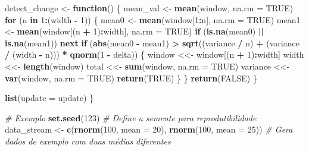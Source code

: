 \documentclass[
]{article}
\newenvironment{Shaded}{\begin{snugshade}}{\end{snugshade}}
\newcommand{\AttributeTok}[1]{\textcolor[rgb]{0.13,0.29,0.53}{#1}}
\newcommand{\CommentTok}[1]{\textcolor[rgb]{0.56,0.35,0.01}{\textit{#1}}}
\newcommand{\ConstantTok}[1]{\textcolor[rgb]{0.56,0.35,0.01}{#1}}
\newcommand{\ControlFlowTok}[1]{\textcolor[rgb]{0.13,0.29,0.53}{\textbf{#1}}}
\newcommand{\DecValTok}[1]{\textcolor[rgb]{0.00,0.00,0.81}{#1}}
\newcommand{\FunctionTok}[1]{\textcolor[rgb]{0.13,0.29,0.53}{\textbf{#1}}}
\newcommand{\NormalTok}[1]{#1}
\newcommand{\OtherTok}[1]{\textcolor[rgb]{0.56,0.35,0.01}{#1}}
\newcommand{\SpecialCharTok}[1]{\textcolor[rgb]{0.81,0.36,0.00}{\textbf{#1}}}
\begin{document}
\begin{Shaded}
\begin{Highlighting}[]
\NormalTok{  detect\_change }\OtherTok{\textless{}{-}} \ControlFlowTok{function}\NormalTok{() \{}
\NormalTok{    mean\_val }\OtherTok{\textless{}{-}} \FunctionTok{mean}\NormalTok{(window, }\AttributeTok{na.rm =} \ConstantTok{TRUE}\NormalTok{)}
    \ControlFlowTok{for}\NormalTok{ (n }\ControlFlowTok{in} \DecValTok{1}\SpecialCharTok{:}\NormalTok{(width }\SpecialCharTok{{-}} \DecValTok{1}\NormalTok{)) \{}
\NormalTok{      mean0 }\OtherTok{\textless{}{-}} \FunctionTok{mean}\NormalTok{(window[}\DecValTok{1}\SpecialCharTok{:}\NormalTok{n], }\AttributeTok{na.rm =} \ConstantTok{TRUE}\NormalTok{)}
\NormalTok{      mean1 }\OtherTok{\textless{}{-}} \FunctionTok{mean}\NormalTok{(window[(n }\SpecialCharTok{+} \DecValTok{1}\NormalTok{)}\SpecialCharTok{:}\NormalTok{width], }\AttributeTok{na.rm =} \ConstantTok{TRUE}\NormalTok{)}
      \ControlFlowTok{if}\NormalTok{ (}\FunctionTok{is.na}\NormalTok{(mean0) }\SpecialCharTok{||} \FunctionTok{is.na}\NormalTok{(mean1)) }\ControlFlowTok{next}
      \ControlFlowTok{if}\NormalTok{ (}\FunctionTok{abs}\NormalTok{(mean0 }\SpecialCharTok{{-}}\NormalTok{ mean1) }\SpecialCharTok{\textgreater{}} \FunctionTok{sqrt}\NormalTok{((variance }\SpecialCharTok{/}\NormalTok{ n) }\SpecialCharTok{+}\NormalTok{ (variance }\SpecialCharTok{/}\NormalTok{ (width }\SpecialCharTok{{-}}\NormalTok{ n))) }\SpecialCharTok{*} \FunctionTok{qnorm}\NormalTok{(}\DecValTok{1} \SpecialCharTok{{-}}\NormalTok{ delta)) \{}
\NormalTok{        window }\OtherTok{\textless{}\textless{}{-}}\NormalTok{ window[(n }\SpecialCharTok{+} \DecValTok{1}\NormalTok{)}\SpecialCharTok{:}\NormalTok{width]}
\NormalTok{        width }\OtherTok{\textless{}\textless{}{-}} \FunctionTok{length}\NormalTok{(window)}
\NormalTok{        total }\OtherTok{\textless{}\textless{}{-}} \FunctionTok{sum}\NormalTok{(window, }\AttributeTok{na.rm =} \ConstantTok{TRUE}\NormalTok{)}
\NormalTok{        variance }\OtherTok{\textless{}\textless{}{-}} \FunctionTok{var}\NormalTok{(window, }\AttributeTok{na.rm =} \ConstantTok{TRUE}\NormalTok{)}
        \FunctionTok{return}\NormalTok{(}\ConstantTok{TRUE}\NormalTok{)}
\NormalTok{      \}}
\NormalTok{    \}}
    \FunctionTok{return}\NormalTok{(}\ConstantTok{FALSE}\NormalTok{)}
\NormalTok{  \}}
  
  \FunctionTok{list}\NormalTok{(}\AttributeTok{update =}\NormalTok{ update)}
\NormalTok{\}}

\CommentTok{\# Exemplo }
\FunctionTok{set.seed}\NormalTok{(}\DecValTok{123}\NormalTok{) }\CommentTok{\# Define a semente para reprodutibilidade}
\NormalTok{data\_stream }\OtherTok{\textless{}{-}} \FunctionTok{c}\NormalTok{(}\FunctionTok{rnorm}\NormalTok{(}\DecValTok{100}\NormalTok{, }\AttributeTok{mean =} \DecValTok{20}\NormalTok{), }\FunctionTok{rnorm}\NormalTok{(}\DecValTok{100}\NormalTok{, }\AttributeTok{mean =} \DecValTok{25}\NormalTok{)) }\CommentTok{\# Gera dados de exemplo com duas médias diferentes}


\end{Highlighting}
\end{Shaded}
\end{document}
